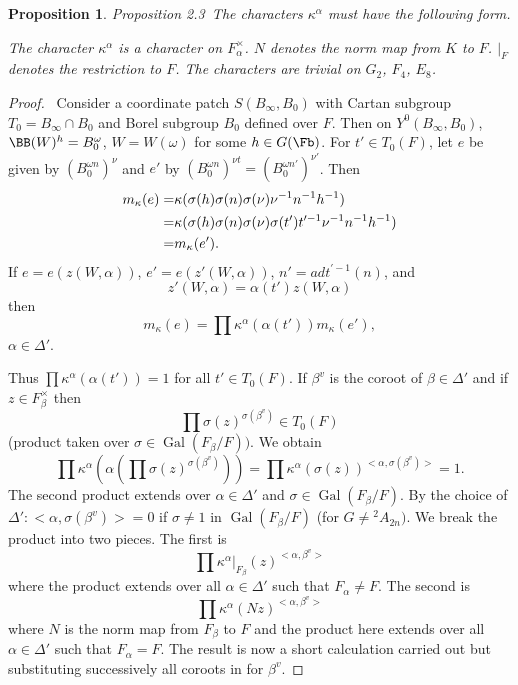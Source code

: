 \documentclass{memo-l}
\newtheorem{proposition}[theorem]{Proposition}
\theoremstyle{definition}
\theoremstyle{remark}
\numberwithin{section}{chapter}
\numberwithin{equation}{chapter}
\begin{document}
\begin{proposition}{Proposition 2.3}\ The characters ${\kappa}^{{\alpha}}$ must have the
following form.

\vfill\eject
\medskip
\eject\vfill
\vfill\eject

\noindent
The character ${\kappa}^{{\alpha}}$ is a character on $F_{{\alpha}}^{\times}$.
$N$ denotes the norm map from $K$ to $F$.  $\vert _{F}$ denotes the
restriction to $F$. The characters are trivial on $G_2$, $F_4$, $E_8$.
\end{proposition}


\begin{proof} \ Consider
a coordinate patch $S(B_{ \infty },B_{0})$ with Cartan subgroup
$T_{0} = B_{{\infty}} \cap B_{0}$ and Borel subgroup $B_{0}$ defined over
$F$.  Then on $Y^{0}(B_{{\infty}},B_{0})$, ${\BB}(W)^{h}  = 
B_{0}^{{\omega}}$, $W = W({\omega})$ for some $h  \in  G(\Fb)$.  For $t'
 \in  T_{0}(F)$, let $e$ be given by $(B_{0}^{{\omega}n})^{{\nu}}$ and $e'$
by $(B_{0}^{{\omega}n})^{{\nu}t}  =  (B_{0}^{{\omega}n'})^{{\nu}'}$.  Then
$$\aligned m_{{\kappa}}(e)  =& 
{\kappa}({\sigma}(h){\sigma}(n){\sigma}({\nu}){\nu}^{-1}n^{-1}h^{-1}) 
\\ =& 
{\kappa}({\sigma}(h){\sigma}(n){\sigma}({\nu}){\sigma}(t')t^{\prime-1}{\nu}^{-1}n^{-1}h^{-1})
 \\=&  m_{{\kappa}}(e').\endaligned 
$$
If $e = e(z(W,{\alpha}))$, $e' = e(z'(W,{\alpha}))$, $n' =  adt^{\prime-1}(n)$, and
$$z'(W,{\alpha}) = {\alpha}(t')z(W,{\alpha})$$ then $$m_{{\kappa}}(e) = 
\prod{\kappa}^{{\alpha}}({\alpha}(t'))m_{{\kappa}}(e'),$$ ${\alpha}  \in 
{\Delta}'$.

   Thus $\prod{\kappa}^{{\alpha}}({\alpha}(t')) = 1$ for all $t'  \in 
T_{0}(F)$.  If ${\beta}^{v}$ is the coroot of ${\beta}  \in  {\Delta}'$ and
if $z  \in  F_{{\beta}}^{\times}$ then $$\prod{\sigma}(z)^{{\sigma}({\beta}^{v})} 
 \in  T_{0}(F)$$ (product taken over ${\sigma}
 \in  \operatorname{Gal}(F_{{\beta}}/F))$.  We obtain
$$
\prod{\kappa}^{{\alpha}}({\alpha}(\prod{\sigma}(z)^{{\sigma}({\beta}^{v})}))  
= \prod{\kappa}^{{\alpha}}({\sigma}(z))^{<{\alpha},{\sigma}({\beta}^{v})>} = 1.
$$
The second product extends over ${\alpha}  \in  {\Delta}'$ and ${\sigma}
 \in  \operatorname{Gal}(F_{{\beta}}/F)$.  By the choice of ${\Delta}' :
<{\alpha},{\sigma}({\beta}^{v})> = 0$ if ${\sigma} \ne 1$ in
$\operatorname{Gal}(F_{{\beta}}/F)$ (for $G \ne {{}^{2}A_{2n}})$.  We break the product into
two pieces.  The first is
$$
\prod{\kappa}^{{\alpha}}\vert _{F_{{\beta}}}
(z)^{<{\alpha},{\beta^v}>}
$$
where the product extends over all ${\alpha}  \in  {\Delta}'$ such that
$F_{{\alpha}} \ne F$.  The second is
$$
\prod{\kappa}^{{\alpha}}(Nz)^{<{\alpha},{\beta^v}>}
$$
where $N$ is the norm map from $F_{{\beta}}$ to $F$ and the product here
extends over all ${\alpha}  \in  {\Delta}'$ such that $F_{{\alpha}}  =  F$.
The result is now a short calculation carried out but substituting
successively all coroots in for ${\beta}^{v}$.
\end{proof} 
\end{document}
